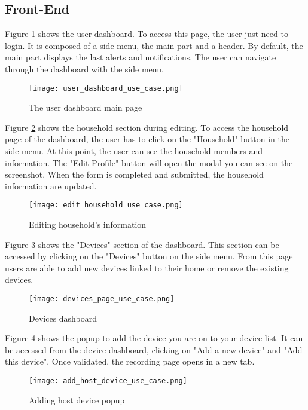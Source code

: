 \documentclass[conference]{IEEEtran}
\begin{document}
\subsection{Front-End}

Figure \ref{fig:user_dashboard} shows the user dashboard.
To access this page, the user just need to login. It is composed of a side menu, the main part and a header. By default, the main part displays the last alerts and notifications. The user can navigate through the dashboard with the side menu.

\begin{figure}[H]
    \centering
    \texttt{[image: user\_dashboard\_use\_case.png]}
    \caption{The user dashboard main page}
    \label{fig:user_dashboard}
\end{figure}

Figure \ref{fig:household} shows the household section during editing.
To access the household page of the dashboard, the user has to click on the "Household" button in the side menu. At this point, the user can see the household members and information. The "Edit Profile" button will open the modal you can see on the screenshot.
When the form is completed and submitted, the household information are updated.

\begin{figure}[H]
    \centering
    \texttt{[image: edit\_household\_use\_case.png]}
    \caption{Editing household's information}
    \label{fig:household}
\end{figure}

Figure \ref{fig:devices} shows the "Devices" section of the dashboard.
This section can be accessed by clicking on the "Devices" button on the side menu. From this page users are able to add new devices linked to their home or remove the existing devices.

\begin{figure}[H]
    \centering
    \texttt{[image: devices\_page\_use\_case.png]}
    \caption{Devices dashboard}
    \label{fig:devices}
\end{figure}

Figure \ref{fig:host_device} shows the popup to add the device you are on to your device list. It can be accessed from the device dashboard, clicking on "Add a new device" and "Add this device".
Once validated, the recording page opens in a new tab.

\begin{figure}[H]
    \centering
    \texttt{[image: add\_host\_device\_use\_case.png]}
    \caption{Adding host device popup}
    \label{fig:host_device}
\end{figure}
\end{document}
